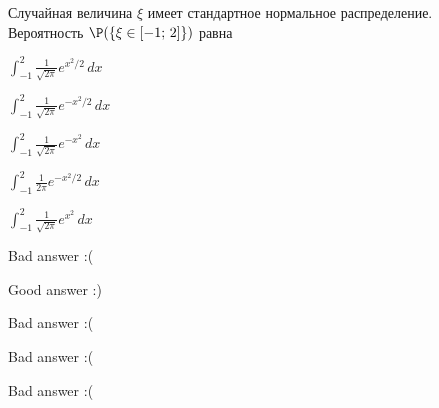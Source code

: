 
\begin{question}
Случайная величина \(\xi\) имеет стандартное нормальное распределение.
Вероятность \(\P(\{\xi \in [-1; \, 2]\})\) равна
\begin{answerlist}
  \item \(\int_{-1}^{2}\tfrac{1}{\sqrt{2\pi}}e^{x^2 / 2}\,dx\)
  \item \(\int_{-1}^{2}\tfrac{1}{\sqrt{2\pi}}e^{-x^2 / 2}\,dx\)
  \item \(\int_{-1}^{2}\tfrac{1}{\sqrt{2\pi}}e^{-x^2}\,dx\)
  \item \(\int_{-1}^{2}\tfrac{1}{2\pi}e^{-x^2 / 2}\,dx\)
  \item \(\int_{-1}^{2}\tfrac{1}{\sqrt{2\pi}}e^{x^2}\,dx\)
\end{answerlist}
\end{question}

\begin{solution}
\begin{answerlist}
  \item Bad answer :(
  \item Good answer :)
  \item Bad answer :(
  \item Bad answer :(
  \item Bad answer :(
\end{answerlist}
\end{solution}

